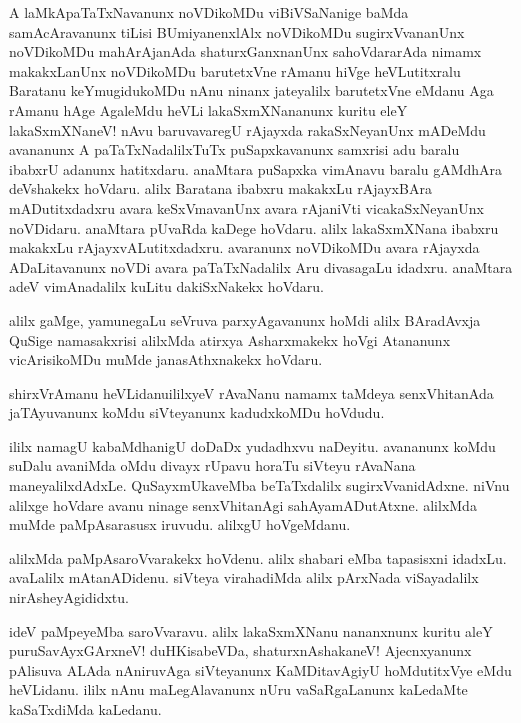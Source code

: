 \begin{mng}
A laMkApaTaTxNavanunx noVDikoMDu viBiVSaNanige baMda samAcAravanunx tiLisi BUmiyanenxlAlx noVDikoMDu sugirxVvananUnx noVDikoMDu mahArAjanAda shaturxGanxnanUnx sahoVdararAda nimamx makakxLanUnx noVDikoMDu barutetxVne rAmanu hiVge heVLutitxralu Baratanu keYmugidukoMDu nAnu ninanx jateyalilx barutetxVne eMdanu Aga rAmanu hAge AgaleMdu heVLi lakaSxmXNananunx kuritu eleY lakaSxmXNaneV! nAvu baruvavaregU rAjayxda rakaSxNeyanUnx mADeMdu avananunx A paTaTxNadalilxTuTx puSapxkavanunx samxrisi adu baralu ibabxrU adanunx hatitxdaru. anaMtara puSapxka vimAnavu baralu gAMdhAra deVshakekx hoVdaru. alilx Baratana ibabxru makakxLu rAjayxBAra mADutitxdadxru avara keSxVmavanUnx avara rAjaniVti vicakaSxNeyanUnx noVDidaru. anaMtara pUvaRda kaDege hoVdaru. alilx lakaSxmXNana ibabxru makakxLu rAjayxvALutitxdadxru. avaranunx noVDikoMDu avara rAjayxda ADaLitavanunx noVDi avara paTaTxNadalilx Aru divasagaLu idadxru. anaMtara adeV vimAnadalilx kuLitu dakiSxNakekx hoVdaru.
\end{mng}

\begin{mng}
alilx gaMge, yamunegaLu seVruva parxyAgavanunx hoMdi alilx BAradAvxja QuSige namasakxrisi alilxMda atirxya Asharxmakekx hoVgi Atananunx vicArisikoMDu muMde janasAthxnakekx hoVdaru.
\end{mng}

\begin{mng}
shirxVrAmanu heVLidanu\mdash ililxyeV rAvaNanu namamx taMdeya senxVhitanAda jaTAyuvanunx koMdu siVteyanunx kadudxkoMDu hoVdudu. 
\end{mng}

\begin{mng}
ililx namagU kabaMdhanigU doDaDx yudadhxvu naDeyitu. avananunx koMdu suDalu avaniMda oMdu divayx rUpavu horaTu siVteyu rAvaNana maneyalilxdAdxLe. QuSayxmUkaveMba beTaTxdalilx sugirxVvanidAdxne. niVnu alilxge hoVdare avanu ninage senxVhitanAgi sahAyamADutAtxne. alilxMda muMde paMpAsarasusx iruvudu. alilxgU hoVgeMdanu.
\end{mng}

\begin{mng}
alilxMda paMpAsaroVvarakekx hoVdenu. alilx shabari eMba tapasisxni idadxLu. avaLalilx mAtanADidenu. siVteya virahadiMda alilx pArxNada viSayadalilx nirAsheyAgididxtu.
\end{mng}

\begin{mng}
ideV paMpeyeMba saroVvaravu. alilx lakaSxmXNanu nananxnunx kuritu aleY puruSavAyxGArxneV! duHKisabeVDa, shaturxnAshakaneV! Ajecnxyanunx pAlisuva ALAda nAniruvAga siVteyanunx KaMDitavAgiyU hoMdutitxVye eMdu heVLidanu. ililx nAnu maLegAlavanunx nUru vaSaRgaLanunx kaLedaMte kaSaTxdiMda kaLedanu.
\end{mng}

